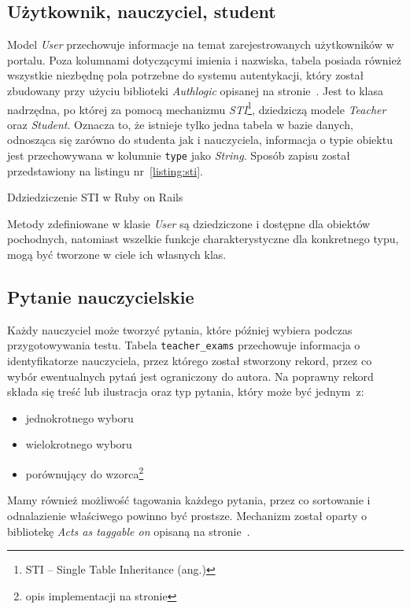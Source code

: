 \documentclass[12pt,twoside]{report}
\begin{document}
\subsection{Użytkownik, nauczyciel, student}
Model \emph{User} przechowuje informacje na temat zarejestrowanych użytkowników w
portalu. Poza kolumnami dotyczącymi imienia i nazwiska, tabela posiada również wszystkie
niezbędnę pola potrzebne do systemu autentykacji, który został zbudowany przy użyciu
biblioteki \emph{Authlogic} opisanej na stronie~\pageref{sec:authlogic}. Jest to klasa
nadrzędna, po której za pomocą mechanizmu \emph{STI}\footnote{STI -- Single Table
Inheritance (ang.)}, dziedziczą modele \emph{Teacher} oraz \emph{Student}. Oznacza to, że
istnieje tylko jedna tabela w bazie danych, odnosząca się zarówno do studenta jak i
nauczyciela, informacja o typie obiektu jest przechowywana w kolumnie \texttt{type} jako
\emph{String}. Sposób zapisu został przedstawiony na listingu nr~\ref{listing:sti}.

\begin{listing}
  
  \caption{Ddziedziczenie STI w Ruby on Rails}
  \label{listing:sti}
\end{listing}


Metody zdefiniowane w klasie \emph{User} są dziedziczone i dostępne dla obiektów
pochodnych, natomiast wszelkie funkcje charakterystyczne dla konkretnego typu, mogą być
tworzone w ciele ich własnych klas.

\subsection{Pytanie nauczycielskie}
Każdy nauczyciel może tworzyć pytania, które później wybiera podczas przygotowywania
testu. Tabela \texttt{teacher\_exams} przechowuje informacja o identyfikatorze
nauczyciela, przez którego został stworzony rekord, przez co wybór ewentualnych pytań jest
ograniczony do autora.
Na poprawny rekord składa się treść lub ilustracja oraz typ pytania, który może być
jednym~z:
\begin{itemize}
  \item{jednokrotnego wyboru}
  \item{wielokrotnego wyboru}
  \item{porównujący do wzorca\footnote{opis implementacji na stronie \pageref{sec:levenshtein}}}
\end{itemize}


Mamy również możliwość tagowania każdego pytania, przez co sortowanie i odnalazienie
właściwego powinno być prostsze. Mechanizm został oparty o bibliotekę \emph{Acts as taggable
on} opisaną na stronie~\pageref{sec:acts_as_taggable_on}.
\end{document}
